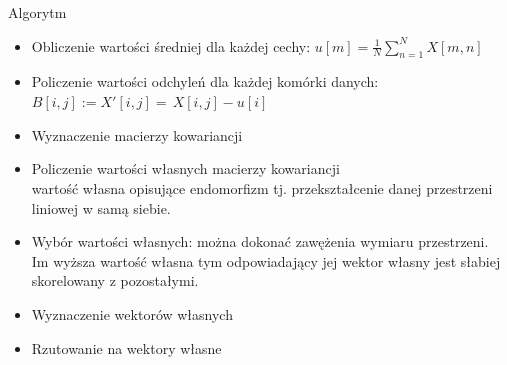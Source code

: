 \documentclass[a4paper]{beamer}
\begin{document}
\begin{frame}
\begin{block}{Algorytm}
\begin{itemize}
\item Obliczenie wartości średniej dla każdej cechy: $u[m]=\frac{1}{N} \sum\limits_{n=1}^N X[m,n]$
\item Policzenie wartości odchyleń dla każdej komórki danych: $B[i,j] := X'[i,j] =\frac{}{} X[i,j]-u[i]$
\item Wyznaczenie macierzy kowariancji%
\item Policzenie wartości własnych macierzy kowariancji \\%
{\footnotesize wartość własna opisujące endomorfizm tj. przekształcenie danej przestrzeni liniowej w samą siebie.}
\item Wybór wartości własnych: można dokonać zawężenia wymiaru przestrzeni.\\
Im wyższa wartość własna tym odpowiadający jej wektor własny jest słabiej skorelowany z pozostałymi.
\item Wyznaczenie wektorów własnych%
\item Rzutowanie na wektory własne%

\end{itemize}
\end{block}
\end{frame}
\end{document}
